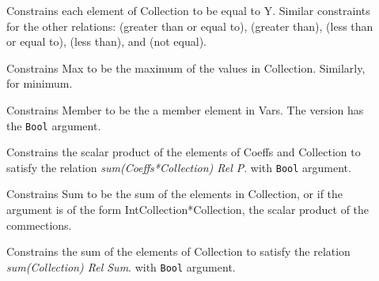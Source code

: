 \begin{description}

\item[]
Constrains each element of Collection to be equal to Y. Similar constraints
for the other relations: 
 (greater than or equal to), 
 (greater than),
 (less than or equal to),
 (less than), and
 (not equal).


\item[]
Constrains Max to be the maximum of the values in Collection. Similarly,
for minimum.


\item[]
Constrains Member to be the a member element in Vars. The 
 version has the
\verb'Bool' argument.

\item[]
Constrains the scalar product of the elements of Coeffs
 and Collection to satisfy the relation {\em sum(Coeffs*Collection) Rel P}. 
with \verb'Bool' argument.

\item[]
Constrains Sum to be the sum of the elements in Collection, or if the
argument is of the form IntCollection*Collection, the scalar product of the
commections.

\item[]
Constrains the sum of the elements of Collection to satisfy the relation {\em sum(Collection) Rel Sum}.
with \verb'Bool' argument.


\end{description}

